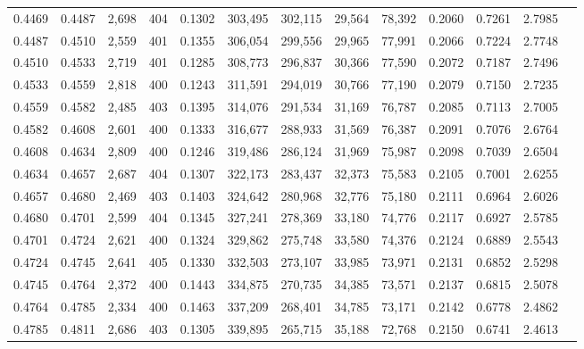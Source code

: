 \begin{tabular}{rrrrrrrrrrrrr}
0.4469 & 0.4487 & 2,698 & 404 &                                     0.1302 & 303,495 & 302,115 &  29,564 &  78,392 & 0.2060 & 0.7261 & 2.7985 \\
0.4487 & 0.4510 & 2,559 & 401 &                                     0.1355 & 306,054 & 299,556 &  29,965 &  77,991 & 0.2066 & 0.7224 & 2.7748 \\
0.4510 & 0.4533 & 2,719 & 401 &                                     0.1285 & 308,773 & 296,837 &  30,366 &  77,590 & 0.2072 & 0.7187 & 2.7496 \\
0.4533 & 0.4559 & 2,818 & 400 &                                     0.1243 & 311,591 & 294,019 &  30,766 &  77,190 & 0.2079 & 0.7150 & 2.7235 \\
0.4559 & 0.4582 & 2,485 & 403 &                                     0.1395 & 314,076 & 291,534 &  31,169 &  76,787 & 0.2085 & 0.7113 & 2.7005 \\
0.4582 & 0.4608 & 2,601 & 400 &                                     0.1333 & 316,677 & 288,933 &  31,569 &  76,387 & 0.2091 & 0.7076 & 2.6764 \\
0.4608 & 0.4634 & 2,809 & 400 &                                     0.1246 & 319,486 & 286,124 &  31,969 &  75,987 & 0.2098 & 0.7039 & 2.6504 \\
0.4634 & 0.4657 & 2,687 & 404 &                                     0.1307 & 322,173 & 283,437 &  32,373 &  75,583 & 0.2105 & 0.7001 & 2.6255 \\
0.4657 & 0.4680 & 2,469 & 403 &                                     0.1403 & 324,642 & 280,968 &  32,776 &  75,180 & 0.2111 & 0.6964 & 2.6026 \\
0.4680 & 0.4701 & 2,599 & 404 &                                     0.1345 & 327,241 & 278,369 &  33,180 &  74,776 & 0.2117 & 0.6927 & 2.5785 \\
0.4701 & 0.4724 & 2,621 & 400 &                                     0.1324 & 329,862 & 275,748 &  33,580 &  74,376 & 0.2124 & 0.6889 & 2.5543 \\
0.4724 & 0.4745 & 2,641 & 405 &                                     0.1330 & 332,503 & 273,107 &  33,985 &  73,971 & 0.2131 & 0.6852 & 2.5298 \\
0.4745 & 0.4764 & 2,372 & 400 &                                     0.1443 & 334,875 & 270,735 &  34,385 &  73,571 & 0.2137 & 0.6815 & 2.5078 \\
0.4764 & 0.4785 & 2,334 & 400 &                                     0.1463 & 337,209 & 268,401 &  34,785 &  73,171 & 0.2142 & 0.6778 & 2.4862 \\
0.4785 & 0.4811 & 2,686 & 403 &                                     0.1305 & 339,895 & 265,715 &  35,188 &  72,768 & 0.2150 & 0.6741 & 2.4613 \\

\end{tabular}
